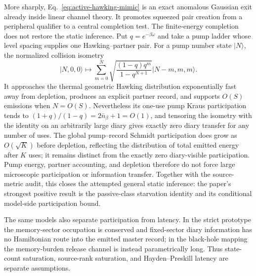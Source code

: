 \documentclass[12pt]{article}
\begin{document}
More sharply, Eq.~\eqref{eq:active-hawking-mimic} is an exact anomalous
Gaussian exit already inside linear channel theory.  It promotes squeezed
pair creation from a peripheral qualifier to a central completion test.  The
finite-energy completion does not restore the static inference.  Put
$q=e^{-\beta\omega}$ and take a pump ladder whose level spacing supplies one
Hawking--partner pair. For a pump number state $\lvert N\rangle$, the normalized
collision isometry
\begin{equation}
 \lvert N,0,0\rangle\longmapsto
 \sum_{m=0}^{N}\sqrt{\frac{(1-q)q^m}{1-q^{N+1}}}
 \lvert N-m,m,m\rangle .
 \label{eq:finite-pump-isometry}
\end{equation}
It approaches the thermal geometric Hawking distribution exponentially fast
away from depletion, produces an explicit partner record, and supports
$O(S)$ emissions when $N=O(S)$.  Nevertheless its one-use pump Kraus
participation tends to $(1+q)/(1-q)=2\bar n_\beta+1=O(1)$, and tensoring the
isometry with the identity on an arbitrarily large diary gives exactly zero
diary transfer for any number of uses.  The global pump--record Schmidt
participation does grow as $O(\sqrt K)$ before depletion, reflecting the
distribution of total emitted energy after $K$ uses; it remains distinct from
the exactly zero diary-visible participation.  Pump energy, partner accounting,
and depletion therefore do not force large microscopic participation or
information transfer.  Together with the source-metric audit, this closes the
attempted general static inference: the paper's strongest positive result is
the passive-class starvation identity and its conditional model-side
participation bound.

The same models also separate participation from latency.  In the
strict prototype the memory-sector occupation is conserved and
fixed-sector diary information has no Hamiltonian route into the
emitted master record; in the black-hole mapping the memory-burden
release channel is instead parametrically long.  Thus state-count
saturation, source-rank saturation, and Hayden--Preskill latency are
separate assumptions.



\end{document}
